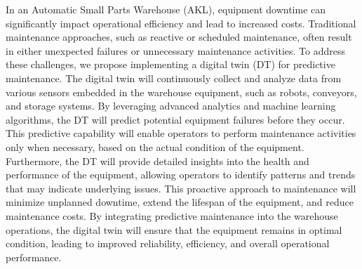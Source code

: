 In an Automatic Small Parts Warehouse (AKL), 
equipment downtime can significantly impact operational 
efficiency and lead to increased costs. 
Traditional maintenance approaches, such as reactive or 
scheduled maintenance, often result in either unexpected 
failures or unnecessary maintenance activities. 
To address these challenges, we propose implementing a digital 
twin (DT) for predictive maintenance.
The digital twin will continuously collect and analyze data 
from various sensors embedded in the warehouse equipment, 
such as robots, conveyors, and storage systems. 
By leveraging advanced analytics and machine learning algorithms,
the DT will predict potential equipment failures before 
they occur. This predictive capability will enable operators to
perform maintenance activities only when necessary, 
based on the actual condition of the equipment.
Furthermore, the DT will provide detailed insights into the 
health and performance of the equipment, 
allowing operators to identify patterns and trends that may 
indicate underlying issues. 
This proactive approach to maintenance will minimize unplanned 
downtime, extend the lifespan of the equipment, 
and reduce maintenance costs.
By integrating predictive maintenance into the warehouse 
operations, the digital twin will ensure that the equipment 
remains in optimal condition, leading to improved reliability, 
efficiency, and overall operational performance.